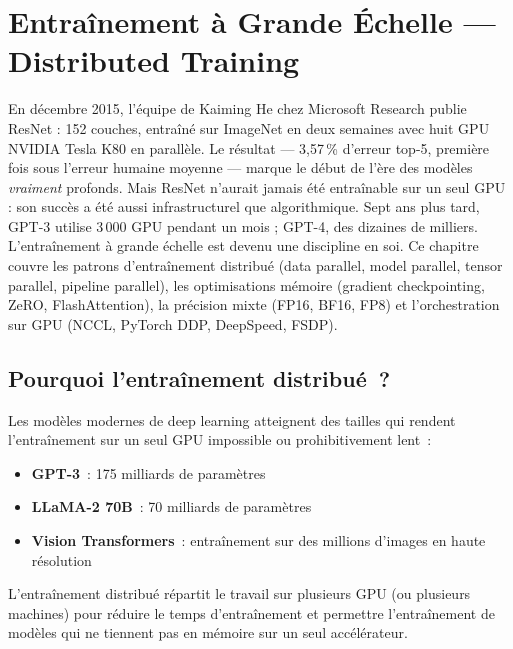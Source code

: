 \chapter{Entra\^inement \`a Grande \'Echelle --- Distributed Training}
\label{ch:entrainement}

En décembre 2015, l'équipe de Kaiming He chez Microsoft Research publie ResNet : 152 couches, entraîné sur ImageNet en deux semaines avec huit GPU NVIDIA Tesla K80 en parallèle. Le résultat --- 3,57\,\% d'erreur top-5, première fois sous l'erreur humaine moyenne --- marque le début de l'ère des modèles \emph{vraiment} profonds. Mais ResNet n'aurait jamais été entraînable sur un seul GPU : son succès a été aussi infrastructurel que algorithmique. Sept ans plus tard, GPT-3 utilise 3\,000 GPU pendant un mois ; GPT-4, des dizaines de milliers. L'entraînement à grande échelle est devenu une discipline en soi. Ce chapitre couvre les patrons d'entraînement distribué (data parallel, model parallel, tensor parallel, pipeline parallel), les optimisations mémoire (gradient checkpointing, ZeRO, FlashAttention), la précision mixte (FP16, BF16, FP8) et l'orchestration sur GPU (NCCL, PyTorch DDP, DeepSpeed, FSDP).

\section{Pourquoi l'entra\^inement distribu\'e~?}
\label{sec:why-distributed}

Les mod\`eles modernes de deep learning atteignent des tailles qui rendent
l'entra\^inement sur un seul GPU impossible ou prohibitivement lent~:
\begin{itemize}
  \item \textbf{GPT-3}~: 175 milliards de param\`etres
  \item \textbf{LLaMA-2 70B}~: 70 milliards de param\`etres
  \item \textbf{Vision Transformers}~: entra\^inement sur des millions
    d'images en haute r\'esolution
\end{itemize}

L'entra\^inement distribu\'e r\'epartit le travail sur plusieurs GPU
(ou plusieurs machines) pour r\'eduire le temps d'entra\^inement et
permettre l'entra\^inement de mod\`eles qui ne tiennent pas en m\'emoire
sur un seul acc\'el\'erateur.

